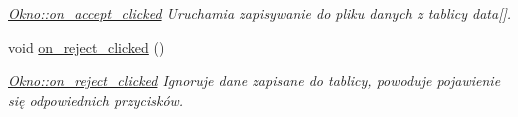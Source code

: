 \begin{DoxyCompactItemize}
\begin{DoxyCompactList}\small\item\em \hyperlink{class_okno_a6fea95038d5967dd336b87935b97170c}{Okno\-::on\-\_\-accept\-\_\-clicked} Uruchamia zapisywanie do pliku danych z tablicy data\mbox{[}\mbox{]}. \end{DoxyCompactList}\item 
\hypertarget{class_okno_a15073474701e4bec563b6a2cdad11ac4}{void \hyperlink{class_okno_a15073474701e4bec563b6a2cdad11ac4}{on\-\_\-reject\-\_\-clicked} ()}\label{class_okno_a15073474701e4bec563b6a2cdad11ac4}

\begin{DoxyCompactList}\small\item\em \hyperlink{class_okno_a15073474701e4bec563b6a2cdad11ac4}{Okno\-::on\-\_\-reject\-\_\-clicked} Ignoruje dane zapisane do tablicy, powoduje pojawienie się odpowiednich przycisków. \end{DoxyCompactList}\end{DoxyCompactItemize}
